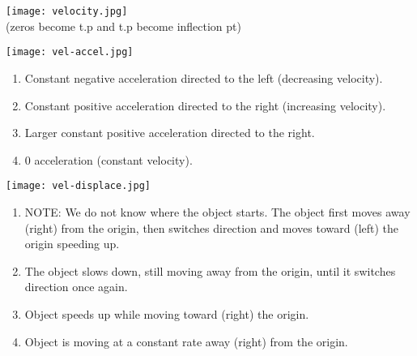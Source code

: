 \documentclass[12pt,fleqn]{book} %
\begin{document}
\begin{multicols}{2}
    \texttt{[image: velocity.jpg]} \\
    (zeros become t.p and t.p become inflection pt) \\
    \vspace*{-4mm}
    \begin{center}
        \texttt{[image: vel-accel.jpg]}
        \begin{enumerate}[label=(\alph*)]
            \item Constant negative acceleration directed to the left (decreasing velocity).
            \item Constant positive acceleration directed to the right (increasing velocity).
            \item Larger constant positive acceleration directed to the right.
            \item 0 acceleration (constant velocity).
        \end{enumerate}

    \end{center}
    \columnbreak

    \hspace*{-20mm}

    \begin{center}
        \vspace*{3mm}
        \texttt{[image: vel-displace.jpg]}
        \begin{enumerate}[label=(\alph*)]
            \item NOTE: We do not know where the object starts. The object first moves away (right) from the origin, then switches direction and moves toward (left) the origin speeding up.
            \item The object slows down, still moving away from the origin, until it switches direction once again.
            \item Object speeds up while moving toward (right) the origin.
            \item Object is moving at a constant rate away (right) from the origin.
        \end{enumerate}

    \end{center}
\end{multicols}

\pagebreak
\end{document}
